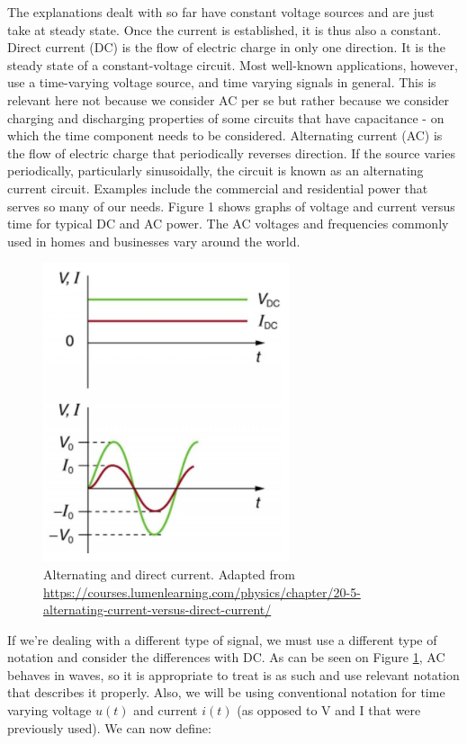 The explanations dealt with so far have constant voltage sources and are just take at steady state. Once the current is established, it is thus also a constant. Direct current (DC) is the flow of electric charge in only one direction. It is the steady state of a constant-voltage circuit. Most well-known applications, however, use a time-varying voltage source, and time varying signals in general. This is relevant here not because we consider AC per se but rather because we consider charging and discharging properties of some circuits that have capacitance - on which the time component needs to be considered. Alternating current (AC) is the flow of electric charge that periodically reverses direction. If the source varies periodically, particularly sinusoidally, the circuit is known as an alternating current circuit. Examples include the commercial and residential power that serves so many of our needs. Figure 1 shows graphs of voltage and current versus time for typical DC and AC power. The AC voltages and frequencies commonly used in homes and businesses vary around the world. 

\begin{figure}[H]
    \centering
    \includegraphics[width=0.35\linewidth]{../../Figures/ACDC.PNG}
    \caption{Alternating and direct current. Adapted from \url{https://courses.lumenlearning.com/physics/chapter/20-5-alternating-current-versus-direct-current/}}
    \label{fig:ACDC}
\end{figure}

If we're dealing with a different type of signal, we must use a different type of notation and consider the differences with DC. As can be seen on Figure \ref{fig:ACDC}, AC behaves in waves, so it is appropriate to treat is as such and use relevant notation that describes it properly. Also, we will be using conventional notation for time varying voltage $u(t)$ and current $i(t)$ (as opposed to V and I that were previously used). We can now define:  


